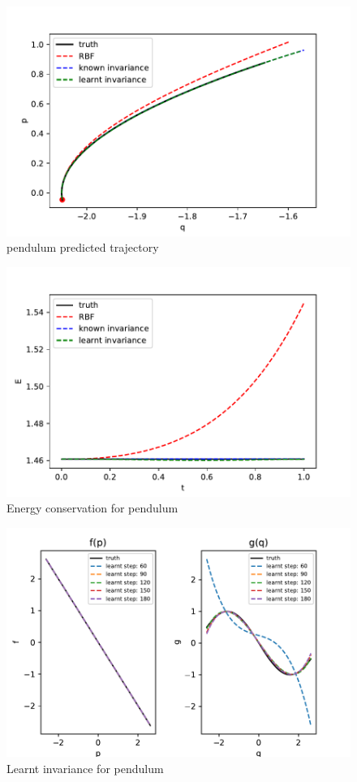 \documentclass{statsmsc}
\begin{document}
\begin{figure}[H]
        \centering
        \includegraphics[width=0.8\linewidth]{../codes/figures/pendulum_predicted.pdf}
        \caption{pendulum predicted trajectory}
        \label{fig:pendulum_prediction}
\end{figure}

\begin{figure}[H] 
  \includegraphics[width=0.8\linewidth]{../codes/figures/pendulum_energy.pdf}
  \centering
  \caption{Energy conservation for pendulum}
  \label{fig:pendulum_energy}
\end{figure}

\begin{figure}[H] 
  \includegraphics[width=0.8\linewidth]{../codes/figures/pendulum_learnt_over_time.pdf}
  \centering
  \caption{Learnt invariance for pendulum}
  \label{fig:pendulum_learnt}
\end{figure}
\end{document}
